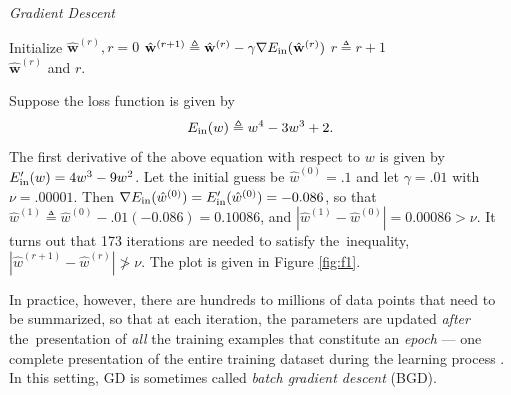 \begin{algorithm}
\caption{\it Gradient Descent}
\label{algo:GD}
\begin{algorithmic}[1]\vspace{.2cm}
\item Initialize $\hat{\mathbf{w}}^{(r)},r=0$\vspace{.2cm}
\vspace{.2cm}
\State $\hat{\mathbf{w}}^{(r+1)}\triangleq \hat{\mathbf{w}}^{(r)} - \gamma\nabla E_{\mathrm{in}}(\hat{\mathbf{w}}^{(r)})$\vspace{.2cm}
\State $r\triangleq r + 1$\vspace{.2cm}
\EndWhile\\\vspace{.2cm}
\Return $\hat{\mathbf{w}}^{(r)}$ and $r$.
\end{algorithmic}
\end{algorithm}
\vspace{-.3cm}

\begin{exmp}\label{ex:gd}
Suppose the loss function is given by
\begin{equation}\label{eq:errgd1}
E_{\mathrm{in}}(w)\triangleq w^4 - 3w^3 + 2.
\end{equation}
The first derivative of the above equation with respect to $w$ is given by ${E_{\mathrm{in}}'(w)=4w^3-9w^2}$. Let the initial guess be $\hat{w}^{(0)}=.1$ and let $\gamma=.01$ with $\nu=.00001$. Then $\nabla E_{\mathrm{in}}(\hat{w}^{(0)})=E_{\mathrm{in}}'(\hat{w}^{(0)})=-0.086$, so that $\hat{w}^{(1)}\triangleq\hat{w}^{(0)}-.01(-0.086)=0.10086$, and $|\hat{w}^{(1)} - \hat{w}^{(0)}| = 0.00086> \nu$. It turns out that 173 iterations are needed to satisfy \mbox{the inequality}, $|\hat{w}^{(r+1)} - \hat{w}^{(r)}| \ngtr \nu$. The plot is given in Figure \ref{fig:f1}.
\end{exmp}
In practice, however, there are hundreds to millions of data points that need to be summarized, so that at each iteration, the parameters are updated \textit{after} \mbox{the presentation} of \textit{all} the training examples that constitute an \textit{epoch} --- one complete presentation of the entire training dataset during the learning process \cite{Haykin1998}. In this setting, GD is sometimes called \textit{batch gradient descent} (BGD).
